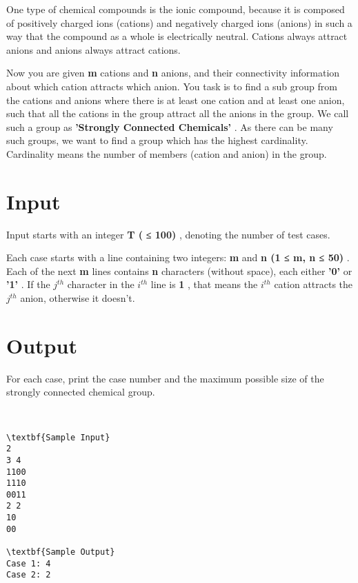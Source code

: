 

One type of chemical compounds is the ionic compound, because it is composed of positively charged ions (cations) and negatively charged ions (anions) in such a way that the compound as a whole is electrically neutral. Cations always attract anions and anions always attract cations.

Now you are given \textbf{ m } cations and \textbf{ n } anions, and their connectivity information about which cation attracts which anion. You task is to find a sub group from the cations and anions where there is at least one cation and at least one anion, such that all the cations in the group attract all the anions in the group. We call such a group as \textbf{ 'Strongly Connected Chemicals' } . As there can be many such groups, we want to find a group which has the highest cardinality. Cardinality means the number of members (cation and anion) in the group.

\section{Input}

Input starts with an integer \textbf{ T ( }\textbf{ ≤ 100) } , denoting the number of test cases.

Each case starts with a line containing two integers: \textbf{ m } and \textbf{ n (1 ≤ m, n ≤ 50) } . Each of the next \textbf{ m } lines contains \textbf{ n } characters (without space), each either \textbf{ '0' } or \textbf{ '1' } . If the \textbf{ $j^{th}$} character in the \textbf{ $i^{th}$} line is \textbf{ 1 } , that means the \textbf{ $i^{th}$} cation attracts the \textbf{ $j^{th}$} anion, otherwise it doesn't.

\section{Output}

For each case, print the case number and the maximum possible size of the strongly connected chemical group.

 
\begin{verbatim}
\textbf{Sample Input}
2
3 4
1100
1110
0011
2 2
10
00

\textbf{Sample Output}
Case 1: 4
Case 2: 2\end{verbatim}

 
